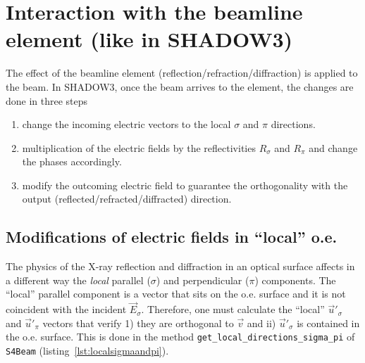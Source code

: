 \documentclass{iucr}
\begin{document}
\section{Interaction with the beamline element (like in SHADOW3)}
\label{sec:S3}

The effect of the beamline element (reflection/refraction/diffraction) is applied to the beam. In SHADOW3, once the beam arrives to the element, the changes are done in three steps 
\begin{enumerate}
    \item change the incoming electric vectors to the local $\sigma$ and $\pi$ directions.
    \item multiplication of the electric fields by the reflectivities $R_\sigma$ and $R_\pi$ and change the phases accordingly.
    \item modify the outcoming electric field to guarantee the orthogonality with the output (reflected/refracted/diffracted) direction.
\end{enumerate}

\subsection{Modifications of electric fields in ``local'' o.e.}
\label{sec:localoe}


The physics of the X-ray reflection and diffraction in an optical surface affects in a different way 
the {\it local} parallel ($\sigma$) and perpendicular ($\pi$) components. The ``local'' parallel component
is a vector that sits on the o.e. surface and it is not coincident with the incident $\vec{E}_\sigma$.
Therefore, one must calculate the ``local'' $\vec{u}'_\sigma$ and $\vec{u}'_\pi$ vectors that verify
1) they are orthogonal to $\vec{v}$ and ii) $\vec{u}'_\sigma$ is contained in the o.e. surface. 
This is done in the method {\tt get\_local\_directions\_sigma\_pi} of {\tt S4Beam} (listing~\ref{lst:localsigmaandpi}).
\end{document}
